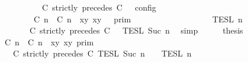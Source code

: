 \begin{isabellebody}
\ \ \ \ \ \ \ \ \ \ \ \ \ \ \ \ \ \ {\isasymTurnstile}\ {\isasymPsi}\ {\isasymtriangleright}\ {\isacharparenleft}{\isacharparenleft}C\ strictly\ precedes\ C\ {\isacharhash}\ {\isasymPhi}{\isacharparenright}\ {\isasymrbrakk}\isactrlsub c\isactrlsub o\isactrlsub n\isactrlsub f\isactrlsub i\isactrlsub g\isanewline
\ \ \ \ \ \ \ \ \ \ \ \ \ \ \ \ {\isacharequal}\ {\isasymlbrakk}{\isasymlbrakk}\ {\isacharparenleft}{\isasymlceil}{\isacharhash}\isactrlsup {\isasymle}\ C\ n{\isacharcomma}\ {\isacharhash}\isactrlsup {\isacharless}\ C\ n{\isasymrceil}\ {\isasymin}\ {\isacharparenleft}{\isasymlambda}{\isacharparenleft}x{\isacharcomma}y{\isacharparenright}{\isachardot}\ x{\isasymle}y{\isacharparenright}{\isacharparenright}\ {\isacharhash}\ {\isasymGamma}\ {\isasymrbrakk}{\isasymrbrakk}\isactrlsub p\isactrlsub r\isactrlsub i\isactrlsub m\isanewline
\ \ \ \ \ \ \ \ \ \ \ \ \ \ \ \ {\isasyminter}\ {\isasymlbrakk}{\isasymlbrakk}\ {\isasymPsi}\ {\isasymrbrakk}{\isasymrbrakk}\isactrlsub T\isactrlsub E\isactrlsub S\isactrlsub L\isactrlbsup {\isasymge}\ n\isactrlesup \isanewline
\ \ \ \ \ \ \ \ \ \ \ \ \ \ \ \ {\isasyminter}\ {\isasymlbrakk}{\isasymlbrakk}\ {\isacharparenleft}C\ strictly\ precedes\ C\ {\isacharhash}\ {\isasymPhi}\ {\isasymrbrakk}{\isasymrbrakk}\isactrlsub T\isactrlsub E\isactrlsub S\isactrlsub L\isactrlbsup {\isasymge}\ Suc\ n\isactrlesup {\isacartoucheclose}\ \isamarkupfalse%
\ simp\isanewline
\ \ \isamarkupfalse%
\ \isamarkupfalse%
\ {\isacharquery}thesis\isanewline
\ \ \isamarkupfalse%
\ {\isacharminus}\isanewline
\ \ \ \ \isamarkupfalse%
\ {\isacartoucheopen}{\isasymlbrakk}\ {\isasymlceil}{\isacharhash}\isactrlsup {\isasymle}\ C\ n{\isacharcomma}\ {\isacharhash}\isactrlsup {\isacharless}\ C\ n{\isasymrceil}\ {\isasymin}\ {\isacharparenleft}{\isasymlambda}{\isacharparenleft}x{\isacharcomma}y{\isacharparenright}{\isachardot}\ x{\isasymle}y{\isacharparenright}\ {\isasymrbrakk}\isactrlsub p\isactrlsub r\isactrlsub i\isactrlsub m\isanewline
\ \ \ \ \ \ \ \ \ \ \ \ {\isasyminter}\ {\isasymlbrakk}\ C\ strictly\ precedes\ C\ {\isasymrbrakk}\isactrlsub T\isactrlsub E\isactrlsub S\isactrlsub L\isactrlbsup {\isasymge}\ Suc\ n\isactrlesup \ {\isasyminter}\ {\isasymlbrakk}{\isasymlbrakk}\ {\isasymPsi}\ {\isasymrbrakk}{\isasymrbrakk}\isactrlsub T\isactrlsub E\isactrlsub S\isactrlsub L\isactrlbsup {\isasymge}\ n\isactrlesup \isanewline

\end{isabellebody}

